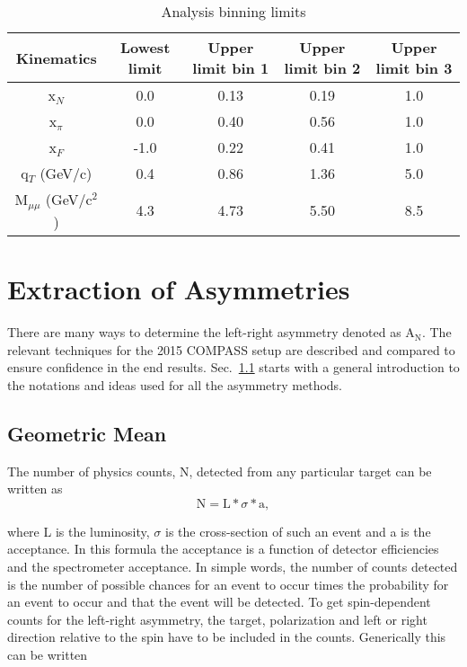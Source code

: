 \begin{table}[h!t]
  \centering
  \begin{tabular}{ |c|c|c|c|c| }
    \hline \textbf{Kinematics}& \textbf{Lowest limit}& \textbf{Upper limit bin
      1}& \textbf{Upper limit bin 2}& \textbf{Upper limit bin 3}\\ \hline
    
    x$_N$& 0.0& 0.13& 0.19& 1.0\\ \hline x$_{\pi}$& 0.0& 0.40& 0.56&
    1.0\\ \hline x$_F$& -1.0& 0.22& 0.41& 1.0\\ \hline q$_T$ (GeV/c)& 0.4& 0.86&
    1.36& 5.0\\ \hline M$_{\mu\mu}$ (GeV/c$^2$)& 4.3& 4.73& 5.50& 8.5 \\ \hline
    
  \end{tabular}
  \caption{Analysis binning limits}
  \label{tab::binning}
\end{table}


\section{Extraction of Asymmetries} 
There are many ways to determine the left-right asymmetry denoted as
A$_{\mathrm{N}}$.  The relevant techniques for the 2015 COMPASS setup are
described and compared to ensure confidence in the end results.
Sec.~\ref{sec::GeoMean} starts with a general introduction to the notations and
ideas used for all the asymmetry methods.

\subsection{Geometric Mean} \label{sec::GeoMean}
The number of physics counts, N, detected from any particular target can be
written as
\begin{equation}
  \label{equ::xsection}
  \mathrm{N} = \mathrm{L} * \sigma * \mathrm{a},
\end{equation}

\noindent
where L is the luminosity, $\sigma$ is the cross-section of such an event and a
is the acceptance.  In this formula the acceptance is a function of detector
efficiencies and the spectrometer acceptance.  In simple words, the number of
counts detected is the number of possible chances for an event to occur times
the probability for an event to occur and that the event will be detected.  To
get spin-dependent counts for the left-right asymmetry, the target, polarization
and left or right direction relative to the spin have to be included in the
counts.  Generically this can be written

